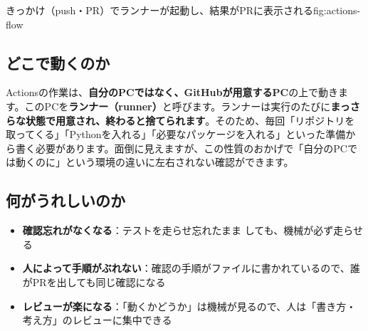 \begin{numfig}{きっかけ（push・PR）でランナーが起動し、結果がPRに表示される}{fig:actions-flow}
\end{numfig}

\subsection{どこで動くのか}

Actionsの作業は、\textbf{自分のPCではなく、GitHubが用意するPC}の上で動きます。このPCを\textbf{ランナー（runner）}と呼びます。ランナーは実行のたびに\textbf{まっさらな状態で用意され、終わると捨てられます}。そのため、毎回「リポジトリを取ってくる」「Pythonを入れる」「必要なパッケージを入れる」といった準備から書く必要があります。面倒に見えますが、この性質のおかげで「自分のPCでは動くのに」という環境の違いに左右されない確認ができます。

\subsection{何がうれしいのか}

\begin{itemize}[leftmargin=1.4em]
  \item \textbf{確認忘れがなくなる}：テストを走らせ忘れたまま  しても、機械が必ず走らせる
  \item \textbf{人によって手順がぶれない}：確認の手順がファイルに書かれているので、誰がPRを出しても同じ確認になる
  \item \textbf{レビューが楽になる}：「動くかどうか」は機械が見るので、人は「書き方・考え方」のレビューに集中できる
\end{itemize}

